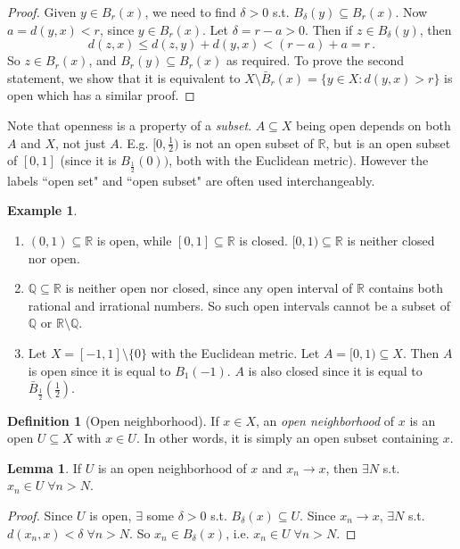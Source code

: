 \documentclass[a4paper,11pt]{article}
\theoremstyle{definition}
\newtheorem*{defn}{Definition}
\newtheorem*{ex}{Example}
\newtheorem*{lem}{Lemma}
\numberwithin{equation}{section}
\begin{document}
\begin{proof}
Given $y\in B_r(x)$, we need to find $\delta>0$ s.t. $B_\delta(y)\subseteq B_r(x)$. Now $a=d(y,x)<r$, since $y\in B_r(x)$. Let $\delta=r-a>0$. Then if $z\in B_\delta(y)$, then
\begin{equation}
    d(z,x)\leq d(z,y)+d(y,x)< (r-a)+a = r\,.
\end{equation}
So $z\in B_r(x)$, and $B_r(y)\subseteq B_r(x)$ as required. To prove the second statement, we show that it is equivalent to $X\setminus\bar{B}_r(x)=\{y\in X:d(y,x)>r\}$ is open which has a similar proof.
\end{proof}

Note that openness is a property of a \emph{subset}. $A\subseteq X$ being open depends on both $A$ and $X$, not just $A$. E.g. $[0,\frac{1}{2})$ is not an open subset of $\mathbb{R}$, but is an open subset of $[0,1]$ (since it is $B_{\frac{1}{2}}(0))$, both with the Euclidean metric). However the labels ``open set" and ``open subset" are often used interchangeably.

\begin{ex}
\leavevmode
\begin{enumerate}
    \item $(0,1)\subseteq\mathbb{R}$ is open, while $[0,1]\subseteq\mathbb{R}$ is closed. $[0,1)\subseteq\mathbb{R}$ is neither closed nor open.
    \item $\mathbb{Q}\subseteq\mathbb{R}$ is neither open nor closed, since any open interval of $\mathbb{R}$ contains both rational and irrational numbers. So such open intervals cannot be a subset of $\mathbb{Q}$ or $\mathbb{R}\setminus\mathbb{Q}$.
    \item Let $X=[-1,1]\setminus\{0\}$ with the Euclidean metric. Let $A=[0,1)\subseteq X$. Then $A$ is open since it is equal to $B_1(-1)$. $A$ is also closed since it is equal to $\bar{B}_{\frac{1}{2}}(\frac{1}{2})$.
\end{enumerate}
\end{ex}

\begin{defn}[Open neighborhood]
If $x\in X$, an \emph{open neighborhood} of $x$ is an open $U\subseteq X$ with $x\in U$. In other words, it is simply an open subset containing $x$.
\end{defn}

\begin{lem}
If $U$ is an open neighborhood of $x$ and $x_n\rightarrow x$, then $\exists N$ s.t. $x_n\in U\;\forall n>N$.
\end{lem}
\begin{proof}
Since $U$ is open, $\exists$ some $\delta>0$ s.t. $B_\delta(x)\subseteq U$. Since $x_n\rightarrow x$, $\exists N$ s.t. $d(x_n,x)<\delta\;\forall n>N$. So $x_n\in B_\delta(x)$, i.e. $x_n\in U\;\forall n>N$.
\end{proof}
\end{document}
